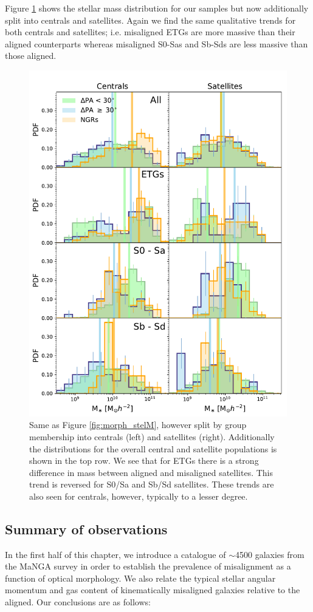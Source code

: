 Figure \ref{fig:group_morph_stelM} shows the stellar mass distribution for our samples but now additionally split into centrals and satellites. Again we find the same qualitative trends for both centrals and satellites; i.e. misaligned ETGs are more massive than their aligned counterparts whereas misaligned S0-Sas and Sb-Sds are less massive than those aligned.
\begin{figure}
    \centering
	\includegraphics[width=0.85\linewidth]{misalignment_MaNGA/delPA_stelM_morph_lim_nsa.pdf}
    \caption{Same as Figure \ref{fig:morph_stelM}, however split by group membership into centrals (left) and satellites (right). Additionally the distributions for the overall central and satellite populations is shown in the top row. We see that for ETGs there is a strong difference in mass between aligned and misaligned satellites. This trend is reversed for S0/Sa and Sb/Sd satellites. These trends are also seen for centrals, however, typically to a lesser degree.}
    \label{fig:group_morph_stelM}
\end{figure}

\subsection{Summary of observations} \label{sec:summary_manga}
In the first half of this chapter, we introduce a catalogue of $\sim$4500 galaxies from the MaNGA survey in order to establish the
prevalence of misalignment as a function of optical morphology. We also relate the typical stellar angular momentum and gas content of kinematically misaligned galaxies relative to the aligned. Our conclusions are as follows:

